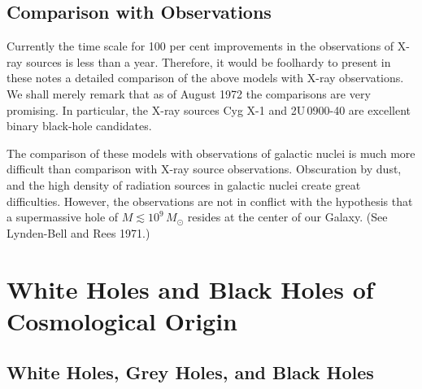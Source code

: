 
\subsection{Comparison with Observations}
\label{sec:5.14}

Currently the time scale for 100 per cent improvements in the observations of
X-ray sources is less than a year. Therefore, it would be foolhardy to present in
these notes a detailed comparison of the above models with X-ray observations.
We shall merely remark that as of August 1972 the comparisons are very
promising. In particular, the X-ray sources Cyg X-1 and 2U\,0900-40 are excellent
binary black-hole candidates.

The comparison of these models with observations of galactic nuclei is much
more difficult than comparison with X-ray source observations. Obscuration by
dust, and the high density of radiation sources in galactic nuclei create great
difficulties. However, the observations are not in conflict with the hypothesis
that a supermassive hole of $M \lesssim 10^9\,M_\odot$ resides at the center of our Galaxy. (See
Lynden-Bell and Rees 1971.) \cite{LyndenBellRees1971}


\section{White Holes and Black Holes of Cosmological Origin}
\label{sec:6}


\subsection{White Holes, Grey Holes, and Black Holes}
\label{sec:6.1}

